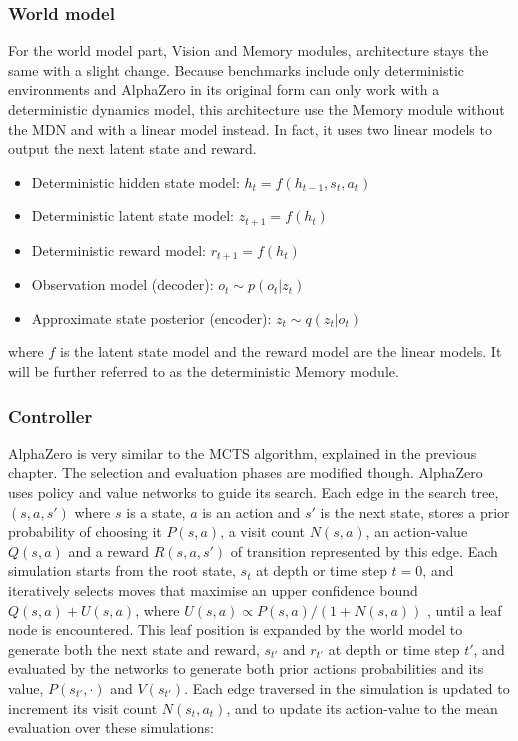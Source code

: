 \subsubsection{World model}

For the world model part, Vision and Memory modules, architecture stays the same with a slight change. Because benchmarks include only deterministic environments and AlphaZero in its original form can only work with a deterministic dynamics model, this architecture use the Memory module without the MDN and with a linear model instead. In fact, it uses two linear models to output the next latent state and reward.
\begin{itemize}
\item Deterministic hidden state model:      $h_t = f(h_{t-1}, s_{t}, a_{t})$
\item Deterministic latent state model:      $z_{t+1} = f(h_t)$
\item Deterministic reward model:            $r_{t+1} = f(h_t)$
\item Observation model (decoder):           $o_t \sim p(o_t|z_t)$
\item Approximate state posterior (encoder): $z_t \sim q(z_t|o_t)$
\end{itemize}
where $f$ is the latent state model and the reward model are the linear models. It will be further referred to as the deterministic Memory module.

\subsubsection{Controller}

AlphaZero \cite{Algo.AlphaZero} is very similar to the MCTS algorithm, explained in the previous chapter. The selection and evaluation phases are modified though. AlphaZero uses policy and value networks to guide its search. Each edge in the search tree, $(s, a, s')$ where $s$ is a state, $a$ is an action and $s'$ is the next state, stores a prior probability of choosing it $P(s, a)$, a visit count $N(s, a)$, an action-value $Q(s, a)$ and a reward $R(s, a, s')$ of transition represented by this edge. Each simulation starts from the root state, $s_t$ at depth or time step $t=0$, and iteratively selects moves that maximise an upper confidence bound $Q(s, a) + U(s, a)$, where $U(s, a) \propto P(s, a)/(1+ N(s, a))$ \cite{Algo.AlphaGoZero}, until a leaf node is encountered. This leaf position is expanded by the world model to generate both the next state and reward, $s_{t'}$ and $r_{t'}$ at depth or time step $t'$, and evaluated by the networks to generate both prior actions probabilities and its value, $P(s_{t'}, \cdot)$ and $V(s_{t'})$. Each edge traversed in the simulation is updated to increment its visit count $N(s_t, a_t)$, and to update its action-value to the mean evaluation over these simulations:

